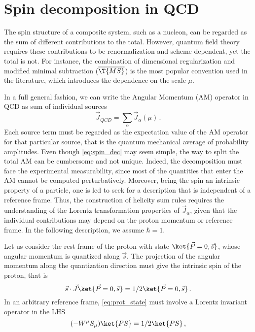 \section{Spin decomposition in QCD}
The spin structure of a composite system, such as a nucleon, can be regarded as the sum of different contributions to the total. However, quantum field theory requires these contributions to be renormalization and scheme dependent, yet the total is not. For instance, the combination of dimensional regularization and modified minimal subtraction ($\overline{\T{MS}}$) is the most popular convention used in the literature, which introduces the dependence on the scale $\mu$.\par
In a full general fashion, we can write the Angular Momentum (AM) operator in QCD as sum of individual sources 
\begin{equation}
    \vec{J}_{QCD} = \sum_{\alpha} \vec{J}_{\alpha}(\mu)\,.
    \label{eq:spin_dec}
\end{equation}
Each source term must be regarded as the expectation value of the AM operator for that particular source, that is the quantum mechanical average of probability amplitudes. Even though \eqref{eq:spin_dec} may seem simple, the way to split the total AM can be cumbersome and not unique. Indeed, the decomposition must face the experimental measurability, since most of the quantities that enter the AM cannot be computed perturbatively. Moreover, being the spin an intrinsic property of a particle, one is led to seek for a description that is independent of a reference frame. Thus, the construction of helicity sum rules requires the understanding of the Lorentz transformation properties of $\vec{J}_{\alpha}$, given that the individual contributions may depend on the proton momentum or reference frame. In the following description, we assume $\hbar = 1$.\par
Let us consider the rest frame of the proton with state $\ket{\vec{P} = 0, \vec{s}}$, whose angular momentum is quantized along $\vec{s}$. The projection of the angular momentum along the quantization direction must give the intrinsic spin of the proton, that is
\begin{equation}
    \vec{s} \cdot \vec{J} \ket{\vec{P} = 0, \vec{s}} = 1/2 \ket{\vec{P} = 0, \vec{s}} \,.
    \label{eq:prot_state}
\end{equation}
In an arbitrary reference frame, \eqref{eq:prot_state} must involve a Lorentz invariant operator in the LHS
\begin{equation}
    (- W^{\mu}S_{\mu}) \ket{PS} = 1/2 \ket{PS}\,,
    \label{eq:lor_inv_spin}
\end{equation}
